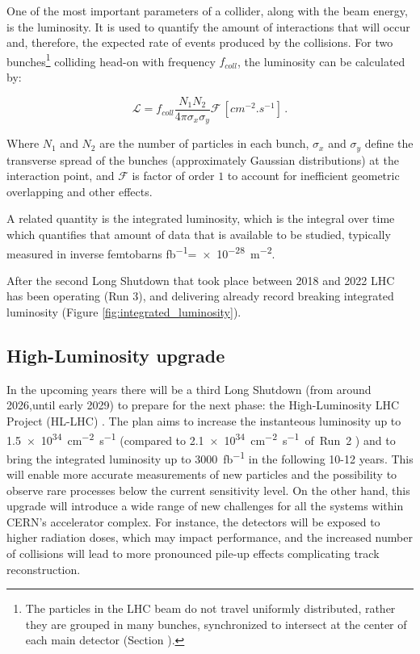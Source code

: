 One of the most important parameters of a collider, along with the beam energy, is the luminosity. It is used to quantify the amount of interactions that will occur and, therefore, the expected rate of events produced by the collisions. For two bunches\footnote{\label{footnote:particle_beam_bunches} The particles in the LHC beam do not travel uniformly distributed, rather they are grouped in many bunches, synchronized to intersect at the center of each main detector (Section ).} colliding head-on with frequency $f_{coll}$, the luminosity can be calculated by:

\begin{equation}
    \mathcal{L} = f_{coll}\frac{N_1 N_2}{4\pi \sigma_x \sigma_y} \mathcal{F} \, \left[\unit{cm^{-2}.s^{-1}}\right] \, .
\end{equation}

Where $N_1$ and $N_2$ are the number of particles in each bunch, $\sigma_x$ and $\sigma_y$ define the transverse spread of the bunches (approximately Gaussian distributions) at the interaction point, and $\mathcal{F}$ is factor of order $1$ to account for inefficient geometric overlapping and other effects.

A related quantity is the integrated luminosity, which is the integral over time which quantifies that amount of data that is available to be studied, typically measured in inverse femtobarns \unit{\femto\barn^{-1}}=\qty{e-28}{\meter^{-2}}.

After the second Long Shutdown that took place between 2018 and 2022 LHC has been operating (Run 3), and delivering already record breaking integrated luminosity (Figure \ref{fig:integrated_luminosity}).

\subsection{High-Luminosity upgrade}\label{subsec:high_luminosity_upgrade}
In the upcoming years there will be a third Long Shutdown (from around 2026,until early 2029) to prepare for the next phase: the High-Luminosity LHC Project (HL-LHC) \cite{cernHLLHCProject}. The plan aims to increase the instanteous luminosity up to \qty{1.5e34}{\centi\meter^{-2}\second^{-1}} (compared to \qty{2.1e34}{\centi\meter^{-2}\second^{-1} of Run 2} \cite{CERN-LHCC-2020-007}) and to bring the integrated luminosity up to \qty{3000}{\femto\barn^{-1}} in the following 10-12 years. This will enable more accurate measurements of new particles and the possibility to observe rare processes below the current sensitivity level. On the other hand, this upgrade will introduce a wide range of new challenges for all the systems within CERN's accelerator complex. For instance, the detectors will be exposed to higher radiation doses, which may impact performance, and the increased number of collisions will lead to more pronounced pile-up effects complicating track reconstruction.

